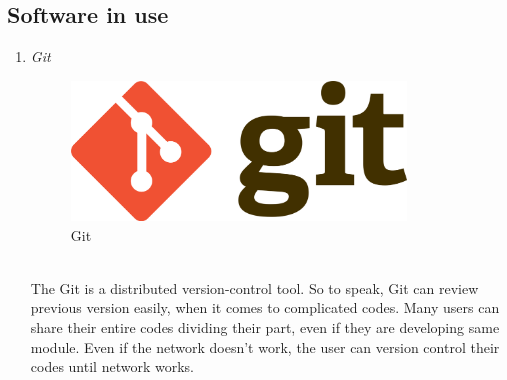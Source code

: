 \documentclass[conference]{IEEEtran}
\begin{document}
\subsection{Software in use}
\begin{enumerate}
  \item \textit{Git }
    \begin{figure}[htbp]
    \centerline{\includegraphics[width=89mm, scale=0.5]{fig/git.png}}
    \caption{Git}
    \label{fig}
    \end{figure}
  \\The Git is a distributed version-control tool. So to speak, Git can review previous version easily, when it comes to complicated codes. Many users can share their entire codes dividing their part, even if they are developing same module. Even if the network doesn’t work, the user can version control their codes until network works.\\
 
    \vspace{50mm}


\end{enumerate}
\end{document}
